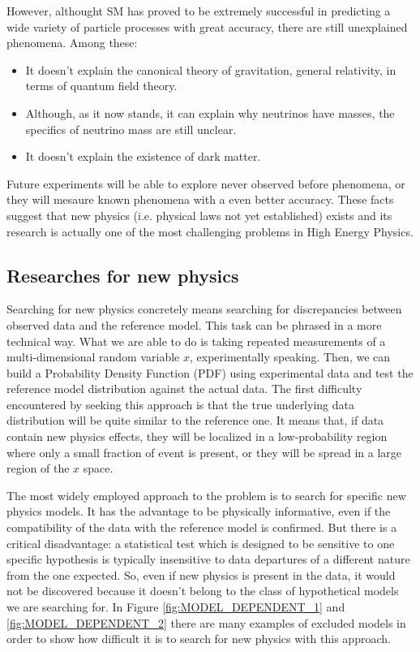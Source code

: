 \noindent
However, althought SM has proved to be extremely successful in predicting a wide variety of particle processes with great accuracy, there are still unexplained phenomena. Among these:
\begin{itemize}
    \item It doesn't explain the canonical theory of gravitation, general relativity, in terms of quantum field theory\footnotemark.
    \item Although, as it now stands, it can explain why neutrinos have masses, the specifics of neutrino mass are still unclear.
    \item It doesn't explain the existence of dark matter.
\end{itemize}
Future experiments will be able to explore never observed before phenomena, or they will mesaure known phenomena with a even better accuracy. These facts suggest that new physics (i.e. physical laws not yet established) exists and its research is actually one of the most challenging problems in High Energy Physics.



\subsection{Researches for new physics}
Searching for new physics concretely means searching for discrepancies between observed data and the reference model. This task can be phrased in a more technical way. What we are able to do is taking repeated measurements of a multi-dimensional random variable $x$, experimentally speaking. Then, we can build a Probability Density Function (PDF) using experimental data and test the reference model distribution against the actual data. The first difficulty encountered by seeking this approach is that the true underlying data distribution will be quite similar to the reference one. It means that, if data contain new physics effects, they will be localized in a low-probability region where only a small fraction of event is present, or they will be spread in a large region of the $x$ space.

The most widely employed approach to the problem is to search for specific new physics models. It has the advantage to be physically informative, even if the compatibility of the data with the reference model is confirmed. But there is a critical disadvantage: a statistical test which is designed to be sensitive to one specific hypothesis is typically insensitive to data departures of a different nature from the one expected. So, even if new physics is present in the data, it would not be discovered because it doesn't belong to the class of hypothetical models we are searching for. In Figure \ref{fig:MODEL_DEPENDENT_1} and \ref{fig:MODEL_DEPENDENT_2} there are many examples of excluded models in order to show how difficult it is to search for new physics with this approach.



